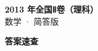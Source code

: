 \documentclass[zihao=-4, a4paper]{ctexart}
\begin{document}
\begin{center}
  {\Large\bfseries 2013 年全国Ⅱ卷（理科）}\\[4pt]
  {\large 数学 · 简答版}
\end{center}
\medskip
{}

\clearpage
{}
\begin{center}{\Large\bfseries 答案速查}\end{center}
\medskip

\end{document}
